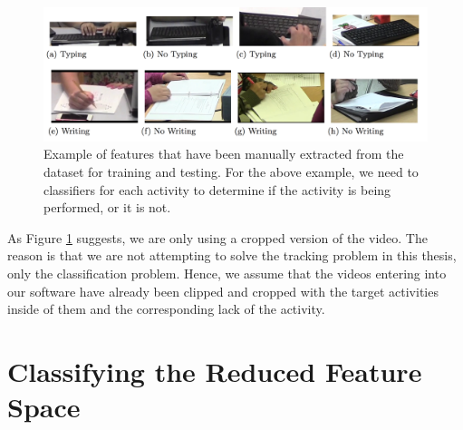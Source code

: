 \begin{figure}[h]
  \label{fig:typing_writing}
  \centering
  \includegraphics[width=\textwidth]{figures/typing_writing_clip}
  \caption{Example of features that have been manually extracted from the dataset
  for training and testing. For the above example, we need to classifiers for each
  activity to determine if the activity is being performed, or it is not.}
\end{figure}

As Figure \ref{fig:typing_writing} suggests, we are only using a cropped version
of the video. The reason is that we are not attempting to solve the tracking
problem in this thesis, only the classification problem. Hence, we assume that
the videos entering into our software have already been clipped and cropped with
the target activities inside of them and the corresponding lack of the activity.


\section{\label{section:classification}Classifying the Reduced Feature Space}
